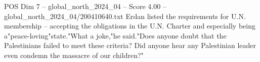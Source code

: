 \begin{textsample}{POS Dim 7 – global\_north\_2024\_04 – Score 4.00 – global\_north\_2024\_04/200410640.txt}
Erdan listed the requirements for U.N. membership -- accepting the obligations in the U.N.
Charter and especially being a"peace-loving"state."What a joke,"he said."Does anyone doubt that the Palestinians failed to meet these criteria?
Did anyone hear any Palestinian leader even condemn the massacre of our children?"

\end{textsample}
